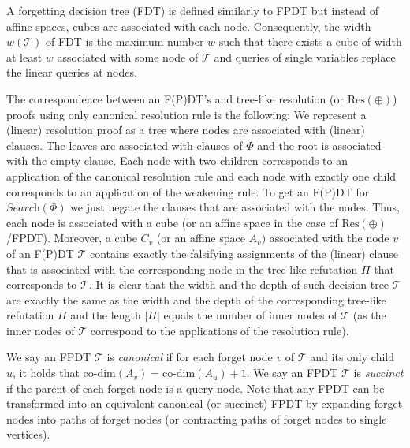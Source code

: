 A forgetting decision tree (FDT) is defined similarly to FPDT but instead of affine spaces, cubes are associated with each node.
Consequently, the width $w(\mathcal{T})$ of FDT is the maximum number $w$ such that there exists a cube of width at least $w$ associated with some node of $\mathcal{T}$ and queries of single variables replace the linear queries at nodes.\par




The correspondence between an F(P)DT’s and tree-like resolution (or $\text{Res}(\oplus)$) proofs using only canonical resolution rule is the following:
We represent a (linear) resolution proof as a tree where nodes are associated with (linear) clauses.
The leaves are associated with clauses of $\Phi$ and the root is associated with the empty clause.
Each node with two children corresponds to an application of the canonical resolution rule and each node with exactly one child corresponds to an application of the weakening rule.
To get an F(P)DT for $\textit{Search}(\Phi)$ we just negate the clauses that are associated with the nodes.
Thus, each node is associated with a cube (or an affine space in the case of $\text{Res}(\oplus)$/FPDT).
Moreover, a cube $C_{v}$ (or an affine space $A_{v})$ associated with the node $v$ of an F(P)DT $\mathcal{T}$ contains exactly the falsifying assignments of the (linear) clause that is associated with the corresponding node in the tree-like refutation $\Pi$ that corresponds to $\mathcal{T}$.
It is clear that the width and the depth of such decision tree $\mathcal{T}$ are exactly the same as the width and the depth of the corresponding tree-like refutation $\Pi$ and the length $|\Pi|$ equals the number of inner nodes of $\mathcal{T}$ (as the inner nodes of $\mathcal{T}$ correspond to the applications of the resolution rule).\par




We say an FPDT $\mathcal{T}$ is \emph{canonical} if for each forget node $v$ of $\mathcal{T}$ and its only child $u$, it holds that $\text{co-dim}(A_{v})=\text{co-dim}(A_{u})+1$.
We say an FPDT $\mathcal{T}$ is \emph{succinct} if the parent of each forget node is a query node.
Note that any FPDT can be transformed into an equivalent canonical (or succinct) FPDT by expanding forget nodes into paths of forget nodes (or contracting paths of forget nodes to single vertices).\par




